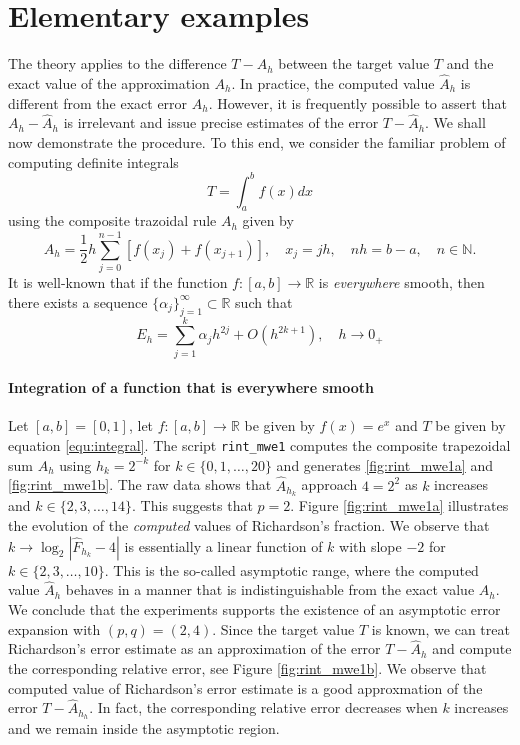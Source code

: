 \documentclass[runningheads]{llncs}
\begin{document}
\section{Elementary examples}

The theory applies to the difference $T - A_h$ between the target value $T$ and the exact value of the approximation $A_h$.
In practice, the computed value $\hat{A}_h$ is different from the exact error $A_h$. However, it is frequently possible to assert that $A_h - \hat{A}_h$ is irrelevant and issue precise estimates of the error $T - \hat{A}_h$. We shall now demonstrate the procedure. To this end, we consider the familiar problem of computing definite integrals
\begin{equation} \label{equ:integral}
  T = \int_{a}^b f(x) dx
\end{equation}
using the composite trazoidal rule $A_h$ given by
\begin{equation}
  A_h = \frac{1}{2}h \sum_{j=0}^{n-1} \left[ f(x_j) + f(x_{j+1}) \right], \quad x_j = jh, \quad nh = b-a, \quad n \in \mathbb{N}.
\end{equation}
It is well-known that if the function $f : [a,b] \rightarrow \mathbb{R} $ is \emph{everywhere} smooth, then there exists a sequence $\{\alpha_j\}_{j=1}^\infty \subset \mathbb{R}$ such that 
\begin{equation}
  E_h = \sum_{j=1}^k \alpha _j h^{2j} + O(h^{2k+1}), \quad h \rightarrow 0_+
\end{equation}

\paragraph{Integration of a function that is everywhere smooth}

Let $[a,b]= [0,1]$, let $f : [a, b] \rightarrow \mathbb{R}$ be given by $f(x) = e^x$ and $T$ be given by equation \eqref{equ:integral}.
The script {\tt rint\_mwe1} computes the composite trapezoidal sum $A_h$ using $h_k = 2^{-k}$ for $k \in \{0,1,\dots,20\}$ and generates \ref{fig:rint_mwe1a} and \ref{fig:rint_mwe1b}.
The raw data shows that $\hat{A}_{h_k}$ approach $4 = 2^2$ as $k$ increases and $k \in \{2,3,\dots,14\}$.
This suggests that $p=2$.
Figure \ref{fig:rint_mwe1a} illustrates the evolution of the \emph{computed} values of Richardson's fraction.
We observe that $k \rightarrow \log_2|\hat{F}_{h_k} - 4|$ is essentially a linear function of $k$ with slope $-2$ for $k \in \{2,3,\dots,10\}$.
This is the so-called asymptotic range, where the computed value $\hat{A}_h$  behaves in a manner that is indistinguishable from the exact value $A_h$.
We conclude that the experiments supports the existence of an asymptotic error expansion with $(p,q) = (2,4)$.
Since the target value $T$ is known, we can treat Richardson's error estimate as an approximation of the error $T - \hat{A}_h$ and compute the corresponding relative error, see Figure \ref{fig:rint_mwe1b}.
We observe that computed value of Richardson's error estimate is a good approxmation of the error $T - \hat{A}_{h_h}$. In fact, the corresponding relative error decreases when $k$ increases and we remain inside the asymptotic region.
\end{document}
